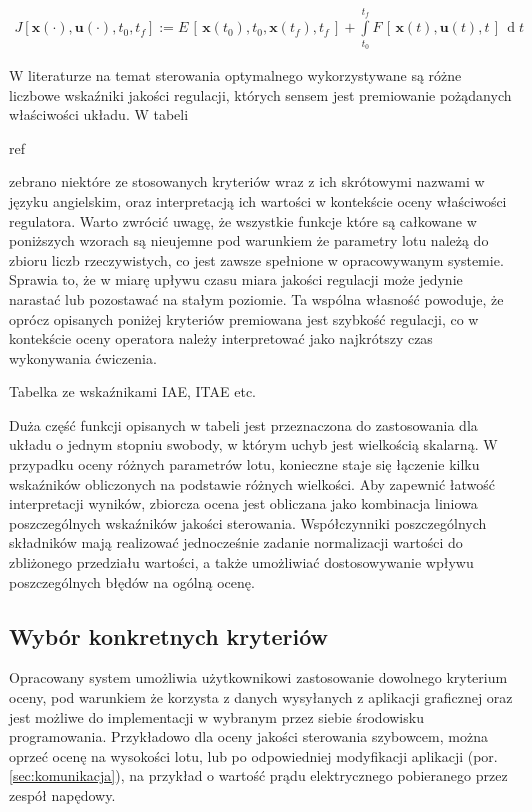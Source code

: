 \begin{align}
    \label{eq:pontryagin}
    J[\textbf{x}(\cdot), \textbf{u}(\cdot), t_0, t_f] :=E\,[\,\textbf{x}(t_0),t_0,\textbf{x}(t_f),t_f\,] + \int\limits_{t_0}^{t_f} F\,[\,\textbf{x}(t),\textbf{u}(t),t\,] \,\operatorname{d}t
\end{align}

W literaturze na temat sterowania optymalnego wykorzystywane są różne liczbowe wskaźniki jakości regulacji, których sensem jest premiowanie pożądanych właściwości układu. W tabeli \begin{todo}ref\end{todo} zebrano niektóre ze stosowanych kryteriów wraz z ich skrótowymi nazwami w języku angielskim, oraz interpretacją ich wartości w kontekście oceny właściwości regulatora. Warto zwrócić uwagę, że wszystkie funkcje które są całkowane w poniższych wzorach są nieujemne pod warunkiem że parametry lotu należą do zbioru liczb rzeczywistych, co jest zawsze spełnione w opracowywanym systemie. Sprawia to, że w miarę upływu czasu miara jakości regulacji może jedynie narastać lub pozostawać na stałym poziomie. Ta wspólna własność powoduje, że oprócz opisanych poniżej kryteriów premiowana jest szybkość regulacji, co w kontekście oceny operatora należy interpretować jako najkrótszy czas wykonywania ćwiczenia.

\begin{todo}
    Tabelka ze wskaźnikami IAE, ITAE etc.
\end{todo}

Duża część funkcji opisanych w tabeli jest przeznaczona do zastosowania dla układu o jednym stopniu swobody, w którym uchyb jest wielkością skalarną. W przypadku oceny różnych parametrów lotu, konieczne staje się łączenie kilku wskaźników obliczonych na podstawie różnych wielkości. Aby zapewnić łatwość interpretacji wyników, zbiorcza ocena jest obliczana jako kombinacja liniowa poszczególnych wskaźników jakości sterowania. Współczynniki poszczególnych składników mają realizować jednocześnie zadanie normalizacji wartości do zbliżonego przedziału wartości, a także umożliwiać dostosowywanie wpływu poszczególnych błędów na ogólną ocenę.

\subsection{Wybór konkretnych kryteriów}
Opracowany system umożliwia użytkownikowi zastosowanie dowolnego kryterium oceny, pod warunkiem że korzysta z  danych wysyłanych z aplikacji graficznej oraz jest możliwe do implementacji w wybranym przez siebie środowisku programowania. Przykładowo dla oceny jakości sterowania szybowcem, można oprzeć ocenę na wysokości lotu, lub po odpowiedniej modyfikacji aplikacji (por. \ref{sec:komunikacja}), na przykład o wartość prądu elektrycznego pobieranego przez zespół napędowy.

